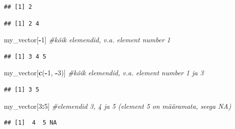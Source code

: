 \documentclass[]{book}
\newenvironment{Shaded}{\begin{snugshade}}{\end{snugshade}}
\newcommand{\KeywordTok}[1]{\textcolor[rgb]{0.13,0.29,0.53}{\textbf{#1}}}
\newcommand{\DecValTok}[1]{\textcolor[rgb]{0.00,0.00,0.81}{#1}}
\newcommand{\CommentTok}[1]{\textcolor[rgb]{0.56,0.35,0.01}{\textit{#1}}}
\newcommand{\OperatorTok}[1]{\textcolor[rgb]{0.81,0.36,0.00}{\textbf{#1}}}
\newcommand{\NormalTok}[1]{#1}
\begin{document}
\begin{verbatim}
## [1] 2
\end{verbatim}

\begin{Shaded}
\end{Shaded}

\begin{verbatim}
## [1] 2 4
\end{verbatim}

\begin{Shaded}
\begin{Highlighting}[]
\NormalTok{my_vector[}\OperatorTok{-}\DecValTok{1}\NormalTok{] }\CommentTok{#kõik elemendid, v.a. element number 1}
\end{Highlighting}
\end{Shaded}

\begin{verbatim}
## [1] 3 4 5
\end{verbatim}

\begin{Shaded}
\begin{Highlighting}[]
\NormalTok{my_vector[}\KeywordTok{c}\NormalTok{(}\OperatorTok{-}\DecValTok{1}\NormalTok{, }\OperatorTok{-}\DecValTok{3}\NormalTok{)] }\CommentTok{#kõik elemendid, v.a. element number 1 ja 3}
\end{Highlighting}
\end{Shaded}

\begin{verbatim}
## [1] 3 5
\end{verbatim}

\begin{Shaded}
\begin{Highlighting}[]
\NormalTok{my_vector[}\DecValTok{3}\OperatorTok{:}\DecValTok{5}\NormalTok{] }\CommentTok{#elemendid 3, 4 ja 5 (element 5 on määramata, seega NA)}
\end{Highlighting}
\end{Shaded}

\begin{verbatim}
## [1]  4  5 NA
\end{verbatim}

\begin{Shaded}
\end{Shaded}
\end{document}
